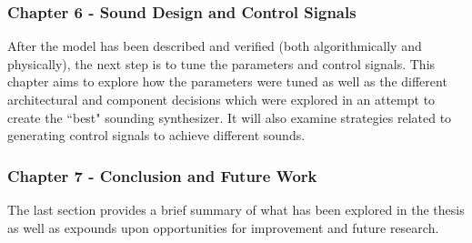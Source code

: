 \documentclass[../main.tex]{subfiles}
\begin{document}
\subsubsection{Chapter 6 - Sound Design and Control Signals}
After the model has been described and verified (both algorithmically and physically), the next step is to tune the parameters and control signals. This chapter aims to explore how the parameters were tuned as well as the different architectural and component decisions which were explored in an attempt to create the ``best" sounding synthesizer. It will also examine strategies related to generating control signals to achieve different sounds.

\subsubsection{Chapter 7 - Conclusion and Future Work}
The last section provides a brief summary of what has been explored in the thesis as well as expounds upon opportunities for improvement and future research.
\end{document}
